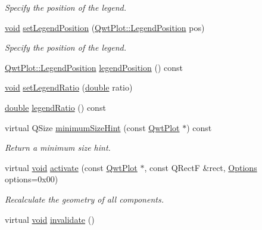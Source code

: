\begin{DoxyCompactItemize}
\begin{DoxyCompactList}\small\item\em Specify the position of the legend. \end{DoxyCompactList}\item 
\hyperlink{group___u_a_v_objects_plugin_ga444cf2ff3f0ecbe028adce838d373f5c}{void} \hyperlink{class_qwt_plot_layout_a001f1eca91803d0eaa9548efc50879eb}{set\-Legend\-Position} (\hyperlink{class_qwt_plot_a31aacb65b5c049dde8c34a0d8482661b}{Qwt\-Plot\-::\-Legend\-Position} pos)
\begin{DoxyCompactList}\small\item\em Specify the position of the legend. \end{DoxyCompactList}\item 
\hyperlink{class_qwt_plot_a31aacb65b5c049dde8c34a0d8482661b}{Qwt\-Plot\-::\-Legend\-Position} \hyperlink{class_qwt_plot_layout_a6351a18b76e22d9e83d682d203599afc}{legend\-Position} () const 
\item 
\hyperlink{group___u_a_v_objects_plugin_ga444cf2ff3f0ecbe028adce838d373f5c}{void} \hyperlink{class_qwt_plot_layout_aabe9f952046139667e055c661bee4dbb}{set\-Legend\-Ratio} (\hyperlink{_super_l_u_support_8h_a8956b2b9f49bf918deed98379d159ca7}{double} ratio)
\item 
\hyperlink{_super_l_u_support_8h_a8956b2b9f49bf918deed98379d159ca7}{double} \hyperlink{class_qwt_plot_layout_a6d5d4e568ad74010742e1fdcfc1c7672}{legend\-Ratio} () const 
\item 
virtual Q\-Size \hyperlink{class_qwt_plot_layout_a068a12c510998760c727a095f5b055fe}{minimum\-Size\-Hint} (const \hyperlink{class_qwt_plot}{Qwt\-Plot} $\ast$) const 
\begin{DoxyCompactList}\small\item\em Return a minimum size hint. \end{DoxyCompactList}\item 
virtual \hyperlink{group___u_a_v_objects_plugin_ga444cf2ff3f0ecbe028adce838d373f5c}{void} \hyperlink{class_qwt_plot_layout_af940812bf4a9d94dac534734168d4ac8}{activate} (const \hyperlink{class_qwt_plot}{Qwt\-Plot} $\ast$, const Q\-Rect\-F \&rect, \hyperlink{class_qwt_plot_layout_aa43457184903f3aaa58e6e073622ef52}{Options} options=0x00)
\begin{DoxyCompactList}\small\item\em Recalculate the geometry of all components. \end{DoxyCompactList}\item 
virtual \hyperlink{group___u_a_v_objects_plugin_ga444cf2ff3f0ecbe028adce838d373f5c}{void} \hyperlink{class_qwt_plot_layout_a44ce72879951571ffe4daa95be0ec242}{invalidate} ()

\end{DoxyCompactItemize}
